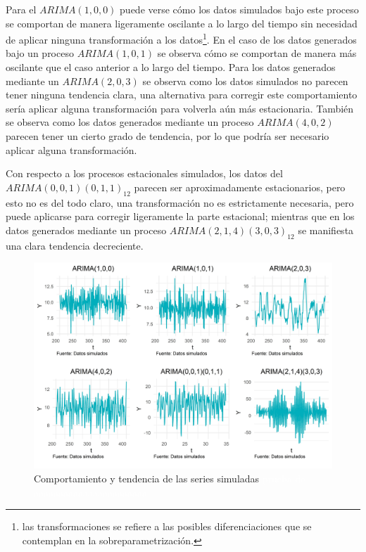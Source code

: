 \documentclass[
]{article}
\begin{document}
Para el \(ARIMA(1,0,0)\) puede verse cómo los datos simulados bajo este
proceso se comportan de manera ligeramente oscilante a lo largo del
tiempo sin necesidad de aplicar ninguna transformación a los
datos\footnote{las transformaciones se refiere a las posibles
  diferenciaciones que se contemplan en la sobreparametrización.}. En el
caso de los datos generados bajo un proceso \(ARIMA(1,0,1)\) se observa
cómo se comportan de manera más oscilante que el caso anterior a lo
largo del tiempo. Para los datos generados mediante un \(ARIMA(2,0,3)\)
se observa como los datos simulados no parecen tener ninguna tendencia
clara, una alternativa para corregir este comportamiento sería aplicar
alguna transformación para volverla aún más estacionaria. También se
observa como los datos generados mediante un proceso \(ARIMA(4,0,2)\)
parecen tener un cierto grado de tendencia, por lo que podría ser
necesario aplicar alguna transformación.

Con respecto a los procesos estacionales simulados, los datos del
\(ARIMA(0,0,1)(0,1,1)_{12}\) parecen ser aproximadamente estacionarios,
pero esto no es del todo claro, una transformación no es estrictamente
necesaria, pero puede aplicarse para corregir ligeramente la parte
estacional; mientras que en los datos generados mediante un proceso
\(ARIMA(2,1,4)(3,0,3)_{12}\) se manifiesta una clara tendencia
decreciente.

\begin{figure}[H]
\includegraphics[width=1\linewidth,height=1\textheight]{Tesis_files/figure-latex/series_simuladas-1} \caption{Comportamiento y tendencia de las series simuladas \textcolor{white}{prueba de aaaaaaaaaaaaaaaaaaaaaaa}}\label{fig:series_simuladas}
\end{figure}
\end{document}
